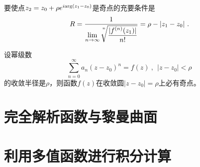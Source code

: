 \documentclass[12pt,a4paper]{article}
\begin{document}
\begin{tcolorbox}[colback=green!5,colframe=green!40!black,title= 推论]
要使点$z_2 = z_0 + \rho e^{i {\rm arg}(z_1 -z_0)}$是奇点的充要条件是
\begin{equation}
R = \dfrac{1}{\underset{n \rightarrow \infty}\lim \sqrt[\leftroot{-2}\uproot{10}n]{\dfrac{|f^{(n)} (z_1) |}{n!}} }  = \rho - |z_1 -z_0| ~.
\end{equation}
\end{tcolorbox}


\begin{tcolorbox}[colback=green!5,colframe=green!40!black,title= 定理]
设幂级数
\begin{equation}
\sum\limits_{n=0}^\infty a_n(z-z_0)^n = f(z) ~, ~~ |z-z_0| < \rho
\end{equation}
的收敛半径是$\rho$，则函数$f(z)$在收敛圆$|z-z_0| = \rho$上必有奇点。
\end{tcolorbox}




\section{完全解析函数与黎曼曲面}







\section{利用多值函数进行积分计算}
\end{document}
